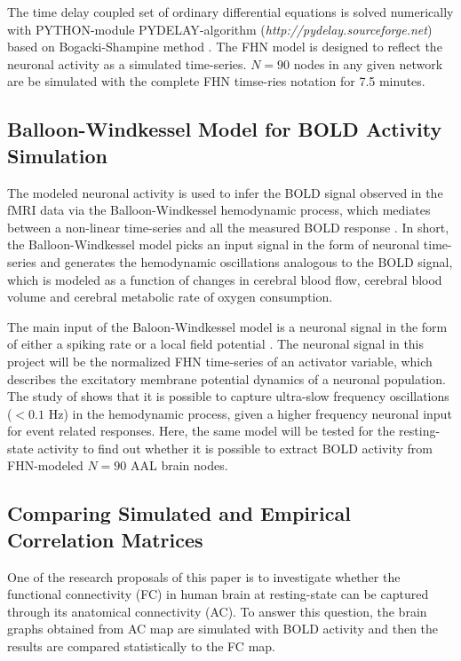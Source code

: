 \documentclass[fleqn,10pt]{wlpeerj}
\begin{document}
The time delay coupled set of ordinary differential equations is solved numerically with \textsc{PYTHON}-module \textsc{PYDELAY}-algorithm (\textit{http://pydelay.sourceforge.net}) based on Bogacki-Shampine method \citep{BOG89, FLU09a}. The FHN model is designed to reflect the neuronal activity as a simulated time-series. $N=90$ nodes in any given network are be simulated with the complete FHN timse-ries notation for 7.5 minutes.  

\subsection*{Balloon-Windkessel Model for BOLD Activity Simulation} 
The modeled neuronal activity is used to infer the BOLD signal observed in the fMRI data via the Balloon-Windkessel hemodynamic process, which mediates between a non-linear time-series and all the measured BOLD response \citep{FRI00}. In short, the Balloon-Windkessel model picks an input signal in the form of neuronal time-series and generates the hemodynamic oscillations analogous to the BOLD signal, which is modeled as a function of changes in cerebral blood flow, cerebral blood volume and cerebral metabolic rate of oxygen consumption. 

The main input of the Baloon-Windkessel model is a neuronal signal in the form of either a spiking rate or a local field potential \citep{SET12}. The neuronal signal in this project will be the normalized FHN time-series of an activator variable, which describes the excitatory membrane potential dynamics of a neuronal population. The study of \cite{FRI00} shows that it is possible to capture ultra-slow frequency oscillations ($<0.1$ Hz) in the hemodynamic process, given a higher frequency neuronal input for event related responses. Here, the same model will be tested for the resting-state activity to find out whether it is possible to extract BOLD activity from FHN-modeled $N=90$ AAL brain nodes.


\subsection*{Comparing Simulated and Empirical Correlation Matrices}       

One of the research proposals of this paper is to investigate whether the functional connectivity (FC) in human brain at resting-state can be captured through its anatomical connectivity (AC). To answer this question, the brain graphs obtained from AC map are simulated with BOLD activity and then the results are compared statistically to the FC map.
\end{document}
